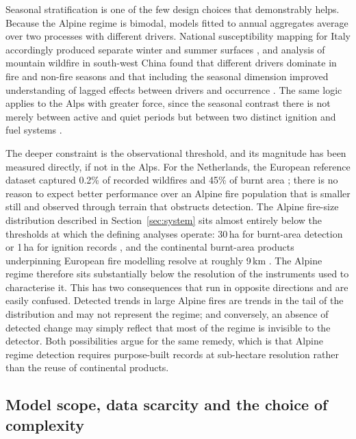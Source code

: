\documentclass[11pt,a4paper]{article}
\begin{document}
Seasonal stratification is one of the few design choices that demonstrably helps. Because the Alpine regime is bimodal, models fitted to annual aggregates average over two processes with different drivers. National susceptibility mapping for Italy accordingly produced separate winter and summer surfaces \citep{trucchia_defining_2022}, and analysis of mountain wildfire in south-west China found that different drivers dominate in fire and non-fire seasons and that including the seasonal dimension improved understanding of lagged effects between drivers and occurrence \citep{wang_seasonal_2023}. The same logic applies to the Alps with greater force, since the seasonal contrast there is not merely between active and quiet periods but between two distinct ignition and fuel systems \citep{muller_forest_2020, bercak_combination_2024}.

The deeper constraint is the observational threshold, and its magnitude has been measured directly, if not in the Alps. For the Netherlands, the European reference dataset captured 0.2\% of recorded wildfires and 45\% of burnt area \citep{stoof_temperate_2024}; there is no reason to expect better performance over an Alpine fire population that is smaller still and observed through terrain that obstructs detection. The Alpine fire-size distribution described in Section~\ref{sec:system} sits almost entirely below the thresholds at which the defining analyses operate: 30\,ha for burnt-area detection \citep{beloiu_climatedriven_2026} or 1\,ha for ignition records \citep{gelabert_assessing_2025}, and the continental burnt-area products underpinning European fire modelling resolve at roughly 9\,km \citep{forrest_understanding_2024}. The Alpine regime therefore sits substantially below the resolution of the instruments used to characterise it. This has two consequences that run in opposite directions and are easily confused. Detected trends in large Alpine fires are trends in the tail of the distribution and may not represent the regime; and conversely, an absence of detected change may simply reflect that most of the regime is invisible to the detector. Both possibilities argue for the same remedy, which is that Alpine regime detection requires purpose-built records at sub-hectare resolution rather than the reuse of continental products.

\subsection{Model scope, data scarcity and the choice of complexity}
\label{sec:complexity}
\end{document}
